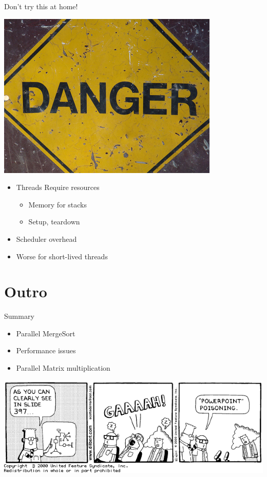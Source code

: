 \begin{frame}{Don't try this at home!}
  \begin{center}
    \includegraphics[scale=0.35]{figures/danger}
  \end{center}


  \begin{itemize}
  \item Threads Require resources
    \begin{itemize}
    \item Memory for stacks
    \item Setup, teardown
    \end{itemize}
  \item Scheduler overhead
  \item Worse for short-lived threads
  \end{itemize}
\end{frame}


\section*{Outro}

\begin{frame}{Summary}
  \begin{itemize}
  \item Parallel MergeSort
  \item Performance issues
  \item Parallel Matrix multiplication
  \end{itemize}


  \begin{center}
    \includegraphics[scale=0.35]{figures/dilbert-2}
  \end{center}
\end{frame}


